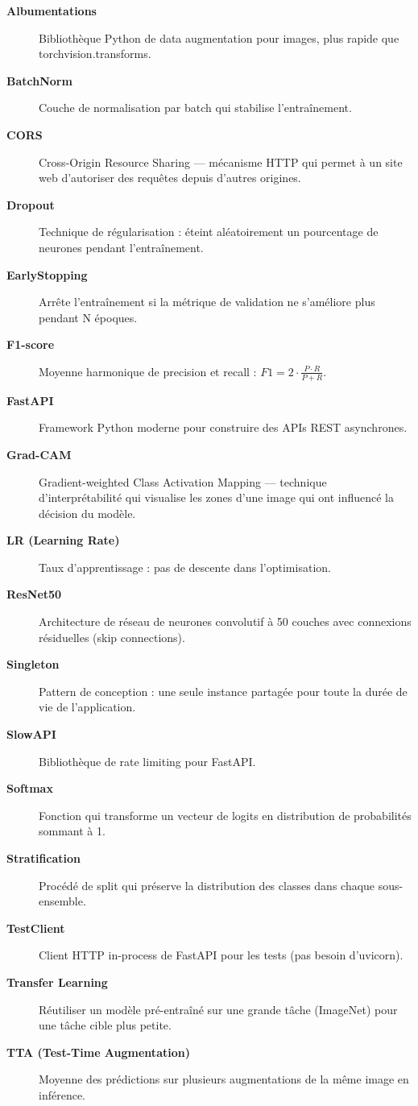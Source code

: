 \documentclass[11pt,a4paper,oneside]{report}
\begin{document}
\begin{description}
\item[\textbf{Albumentations}] Bibliothèque Python de data augmentation pour images, plus rapide que torchvision.transforms.
\item[\textbf{BatchNorm}] Couche de normalisation par batch qui stabilise l'entraînement.
\item[\textbf{CORS}] Cross-Origin Resource Sharing — mécanisme HTTP qui permet à un site web d'autoriser des requêtes depuis d'autres origines.
\item[\textbf{Dropout}] Technique de régularisation : éteint aléatoirement un pourcentage de neurones pendant l'entraînement.
\item[\textbf{EarlyStopping}] Arrête l'entraînement si la métrique de validation ne s'améliore plus pendant N époques.
\item[\textbf{F1-score}] Moyenne harmonique de precision et recall : $F1 = 2 \cdot \frac{P \cdot R}{P+R}$.
\item[\textbf{FastAPI}] Framework Python moderne pour construire des APIs REST asynchrones.
\item[\textbf{Grad-CAM}] Gradient-weighted Class Activation Mapping — technique d'interprétabilité qui visualise les zones d'une image qui ont influencé la décision du modèle.
\item[\textbf{LR (Learning Rate)}] Taux d'apprentissage : pas de descente dans l'optimisation.
\item[\textbf{ResNet50}] Architecture de réseau de neurones convolutif à 50 couches avec connexions résiduelles (skip connections).
\item[\textbf{Singleton}] Pattern de conception : une seule instance partagée pour toute la durée de vie de l'application.
\item[\textbf{SlowAPI}] Bibliothèque de rate limiting pour FastAPI.
\item[\textbf{Softmax}] Fonction qui transforme un vecteur de logits en distribution de probabilités sommant à 1.
\item[\textbf{Stratification}] Procédé de split qui préserve la distribution des classes dans chaque sous-ensemble.
\item[\textbf{TestClient}] Client HTTP in-process de FastAPI pour les tests (pas besoin d'uvicorn).
\item[\textbf{Transfer Learning}] Réutiliser un modèle pré-entraîné sur une grande tâche (ImageNet) pour une tâche cible plus petite.
\item[\textbf{TTA (Test-Time Augmentation)}] Moyenne des prédictions sur plusieurs augmentations de la même image en inférence.
\end{description}
\end{document}
